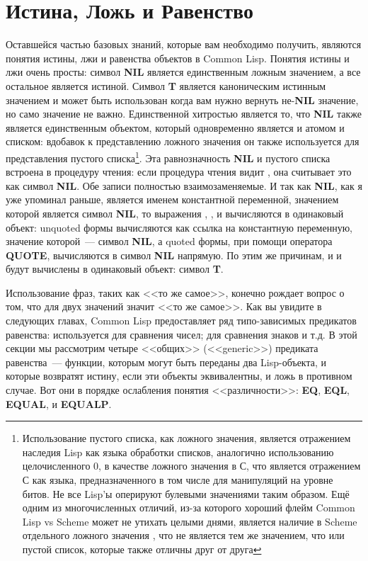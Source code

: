 \section{Истина, Ложь и Равенство}

Оставшейся частью базовых знаний, которые вам необходимо получить, являются понятия
истины, лжи и равенства объектов в Common Lisp. Понятия истины и лжи очень просты: символ
\textbf{NIL} является единственным ложным значением, а все остальное является
истиной. Символ \textbf{T} является каноническим истинным значением и может быть
использован когда вам нужно вернуть не-\textbf{NIL} значение, но само значение не
важно. Единственной хитростью является то, что \textbf{NIL} также является единственным
объектом, который одновременно является и атомом и списком: вдобавок к представлению
ложного значения он также используется для представления пустого
списка\footnote{Использование пустого списка, как ложного значения, является отражением
  наследия Lisp как языка обработки списков, аналогично использованию целочисленного 0, в
  качестве ложного значения в С, что является отражением С как языка, предназначенного в
  том числе для манипуляций на уровне битов. Не все Lisp'ы оперируют булевыми значениями
  таким образом. Ещё одним из многочисленных отличий, из-за которого хороший флейм Common
  Lisp vs Scheme может не утихать целыми днями, является наличие в Scheme отдельного
  ложного значения , что не является тем же значением, что  или пустой
  список, которые также отличны друг от друга}. Эта равнозначность \textbf{NIL} и пустого
списка встроена в процедуру чтения: если процедура чтения видит \code{()}, она считывает
это как символ \textbf{NIL}. Обе записи полностью взаимозаменяемые. И так как
\textbf{NIL}, как я уже упоминал раньше, является именем константной переменной, значением
которой является символ \textbf{NIL}, то выражения , \code{()},  и
 вычисляются в одинаковый объект: unquoted формы вычисляются как ссылка на
константную переменную, значение которой~--- символ \textbf{NIL}, а quoted формы, при
помощи оператора \textbf{QUOTE}, вычисляются в символ \textbf{NIL} напрямую. По этим же
причинам, и  и  будут вычислены в одинаковый объект: символ \textbf{T}.

Использование фраз, таких как <<то же самое>>, конечно рождает вопрос о том, что для двух
значений значит <<то же самое>>. Как вы увидите в следующих главах, Common Lisp
предоставляет ряд типо-зависимых предикатов равенства: \code{=} используется для сравнения
чисел;  для сравнения знаков и т.д. В этой секции мы рассмотрим четыре <<общих>>
(<<generic>>) предиката равенства~--- функции, которым могут быть переданы два Lisp-объекта,
и которые возвратят истину, если эти объекты эквивалентны, и ложь в противном случае. Вот
они в порядке ослабления понятия <<различности>>: \textbf{EQ}, \textbf{EQL}, \textbf{EQUAL},
и \textbf{EQUALP}.

